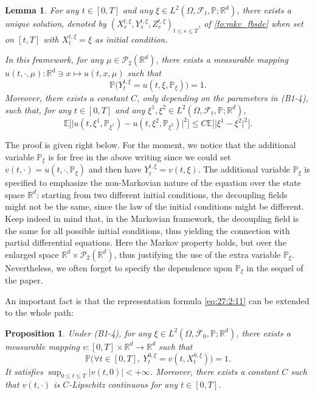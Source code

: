 \documentclass[11pt]{amsart}
\newtheorem{proposition}[theorem]{Proposition}
\newtheorem{lemma}[theorem]{Lemma}
\begin{document}
\begin{lemma}
\label{le:value function}
For any $t \in [0,T]$ and any $\xi \in L^2(\Omega,{\mathcal F}_{t},{\mathbb P};{\mathbb R}^d)$, there exists a unique solution, denoted by 
$(X_{s}^{t,\xi},Y_{s}^{t,\xi},Z_{s}^{t,\xi})_{t \leq s\leq T}$, of \eqref{fo:mkv_fbsde} when set on $[t,T]$ 
with $X_{t}^{t,\xi}=\xi$ as initial condition. 

In this framework, for any $\mu \in {\mathcal P}_{2}({\mathbb R}^d)$, there exists a measurable mapping $u(t,\cdot,\mu) : {\mathbb R}^d \ni x \mapsto  u(t,x,\mu)$ such that
\begin{equation}
\label{eq:27:2:11}
{\mathbb P} \bigl( Y_{t}^{t,\xi} = u(t,\xi,{\mathbb P}_{\xi}) \bigr) =1. 
\end{equation}
Moreover, there exists a constant $C$, only depending on the parameters in (B1-4), such that, for any $t \in [0,T]$ and any 
$\xi^1,\xi^2 \in L^2(\Omega,{\mathcal F}_{t},{\mathbb P};{\mathbb R}^d)$,
\begin{equation}
\label{eq:27:1:2}
{\mathbb E} \bigl[ \vert u(t,\xi^1,{\mathbb P}_{\xi^1}) - u(t,\xi^2,{\mathbb P}_{\xi^2}) \vert^2 \bigr] \leq C {\mathbb E} \bigl[ \vert \xi^1 - \xi^2 \vert^2 \bigr]. 
\end{equation}
\end{lemma}

The proof is given right below. For the moment, we 
notice that the additional variable ${\mathbb P}_{\xi}$ is for free in the above writing since we could set
$v(t,\cdot) = u(t,\cdot,{\mathbb P}_{\xi})$ and then have $Y_{t}^{t,\xi} = v(t,\xi)$.
The additional variable ${\mathbb P}_{\xi}$ is specified to emphasize the non-Markovian nature of the equation over the state space ${\mathbb R}^d$: starting from two different initial conditions, the decoupling fields might not be the same, since the law of the initial conditions might be different. Keep indeed in mind that, in the Markovian framework, the decoupling field is the same for all possible initial conditions, thus yielding the connection with partial differential equations. Here the Markov property holds, but over the enlarged space ${\mathbb R}^d \times {\mathcal P}_{2}({\mathbb R}^d)$, thus justifying the use of the extra variable ${\mathbb P}_{\xi}$. 
Nevertheless, we often forget to specify the dependence upon ${\mathbb P}_{\xi}$ in the sequel of the paper. 

An important fact is that the representation formula \eqref{eq:27:2:11} can be extended to the whole path:
\begin{proposition}
\label{prop:value function}
Under (B1-4), for any $\xi \in L^2(\Omega,{\mathcal F}_{0},{\mathbb P};{\mathbb R}^d)$, there exists a measurable mapping $v: [0,T] \times {\mathbb R}^d \rightarrow {\mathbb R}^d$ such that
\begin{equation*}
{\mathbb P} \bigl( \forall t \in [0,T], \ Y_{t}^{0,\xi} = v(t,X_{t}^{0,\xi}) \bigr) = 1.
\end{equation*}
It satisfies $\sup_{0 \leq t \leq T} \vert v(t,0) \vert < + \infty$. 
Moreover, 
there exists a constant $C$ such that 
$v(t,\cdot)$ is $C$-Lipschitz continuous for any $t \in [0,T]$.
\end{proposition}
\end{document}
